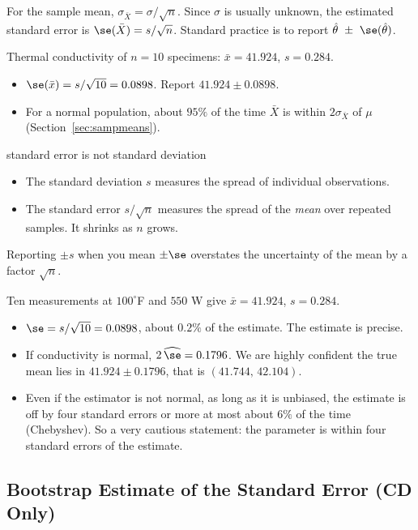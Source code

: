 For the sample mean, $\sigma_{\bar{X}}=\sigma/\sqrt n$. Since $\sigma$ is usually unknown, the estimated standard error is $\se(\bar{X})=s/\sqrt n$. Standard practice is to report $\hat\theta\ \pm\ \se(\hat\theta)$.

\begin{example}
Thermal conductivity of $n=10$ specimens: $\bar{x}=41.924$, $s=0.284$.
\begin{itemize}
  \item $\se(\bar{x})=s/\sqrt{10}=0.0898$. Report $41.924\pm0.0898$.
  \item For a normal population, about $95\%$ of the time $\bar{X}$ is within $2\sigma_{\bar{X}}$ of $\mu$ (Section~\ref{sec:sampmeans}).
\end{itemize}
\end{example}

\begin{pitfall}{standard error is not standard deviation}
\begin{itemize}
  \item The standard deviation $s$ measures the spread of individual observations.
  \item The standard error $s/\sqrt n$ measures the spread of the \emph{mean} over repeated samples. It shrinks as $n$ grows.
\end{itemize}
Reporting $\pm s$ when you mean $\pm\se$ overstates the uncertainty of the mean by a factor $\sqrt n$.
\end{pitfall}

\begin{example}
Ten measurements at $100^\circ$F and $550$ W give $\bar{x}=41.924$, $s=0.284$.
\begin{itemize}
  \item $\se=s/\sqrt{10}=0.0898$, about $0.2\%$ of the estimate. The estimate is precise.
  \item If conductivity is normal, $2\,\widehat{\se}=0.1796$. We are highly confident the true mean lies in $41.924\pm0.1796$, that is $(41.744,\,42.104)$.
  \item Even if the estimator is not normal, as long as it is unbiased, the estimate is off by four standard errors or more at most about $6\%$ of the time (Chebyshev). So a very cautious statement: the parameter is within four standard errors of the estimate.
\end{itemize}
\end{example}

\subsection{Bootstrap Estimate of the Standard Error (CD Only)}

